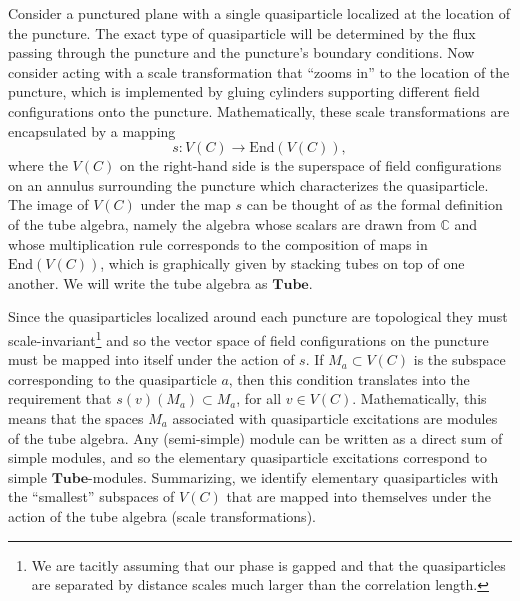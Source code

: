 \documentclass[12pt,a4paper]{article}
\newcounter{arrow}
\newcommand{\ra}{\rightarrow}
\newcommand{\cc}{\mathbb{C}}
\newcommand\be            {\begin{equation}}
\newcommand\ee            {\end{equation}}
\newcommand{\End}{\text{End}}
\newcommand{\fube}{\textbf{Tube}}
\newcommand{\tube}{\textbf{Tube}}
\begin{document}


Consider a punctured plane with a single quasiparticle localized at the location of the puncture. The exact type of quasiparticle will be determined by the flux passing through the puncture and the puncture's boundary conditions. Now consider acting with a scale transformation that ``zooms in'' to the location of the puncture, which is implemented by gluing cylinders supporting different field configurations onto the puncture. Mathematically, these scale transformations are encapsulated by a mapping 
\be s : V(C) \ra \End(V(C)),\ee
where the $V(C)$ on the right-hand side is the superspace of field configurations on an annulus surrounding the puncture which characterizes the quasiparticle. The image of $V(C)$ under the map $s$ can be thought of as the formal definition of the tube algebra, namely the algebra whose scalars are drawn from $\cc$ and whose multiplication rule corresponds to the composition of maps in $\End(V(C))$, which is graphically given by stacking tubes on top of one another. We will write the tube algebra as $\fube$.	

Since the quasiparticles localized around each puncture are topological they must scale-invariant\footnote{We are tacitly assuming that our phase is gapped and that the quasiparticles are separated by distance scales much larger than the correlation length.} and so the vector space of field configurations on the puncture must be mapped into itself under the action of $s$. If $M_a \subset V(C)$ is the subspace corresponding to the quasiparticle $a$, then this condition translates into the requirement that $s(v) (M_a) \subset M_a$, for all $v \in V(C)$. 
Mathematically, this means that the spaces $M_a$ associated with quasiparticle excitations are modules of the tube algebra. Any (semi-simple) module can be written as a direct sum of simple modules, and so the elementary quasiparticle excitations correspond to simple $\tube$-modules. Summarizing, we identify elementary quasiparticles with the ``smallest'' subspaces of $V(C)$ that are mapped into themselves under the action of the tube algebra (scale transformations). 
\end{document}
